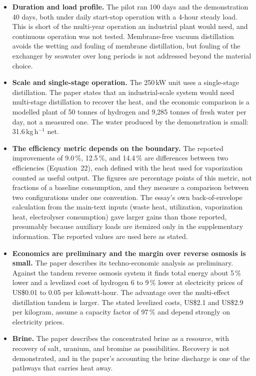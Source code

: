 \documentclass[11pt]{article}
\theoremstyle{definition}
\theoremstyle{remark}
\begin{document}
\begin{itemize}[leftmargin=1.6em,itemsep=2pt]
  \item \textbf{Duration and load profile.} The pilot ran 100 days and the demonstration 40 days, both under daily start-stop operation with a 4-hour steady load. This is short of the multi-year operation an industrial plant would need, and continuous operation was not tested. Membrane-free vacuum distillation avoids the wetting and fouling of membrane distillation, but fouling of the exchanger by seawater over long periods is not addressed beyond the material choice.
  \item \textbf{Scale and single-stage operation.} The 250\,kW unit uses a single-stage distillation. The paper states that an industrial-scale system would need multi-stage distillation to recover the heat, and the economic comparison is a modelled plant of 50 tonnes of hydrogen and 9,285 tonnes of fresh water per day, not a measured one. The water produced by the demonstration is small: 31.6\,kg\,h$^{-1}$ net.
  \item \textbf{The efficiency metric depends on the boundary.} The reported improvements of 9.0\,\%, 12.5\,\%, and 14.4\,\% are differences between two efficiencies (Equation~22), each defined with the heat used for vaporization counted as useful output. The figures are percentage points of this metric, not fractions of a baseline consumption, and they measure a comparison between two configurations under one convention. The essay's own back-of-envelope calculation from the main-text inputs (waste heat, utilization, vaporization heat, electrolyser consumption) gave larger gains than those reported, presumably because auxiliary loads are itemized only in the supplementary information. The reported values are used here as stated.
  \item \textbf{Economics are preliminary and the margin over reverse osmosis is small.} The paper describes its techno-economic analysis as preliminary. Against the tandem reverse osmosis system it finds total energy about 5\,\% lower and a levelized cost of hydrogen 6 to 9\,\% lower at electricity prices of US\$0.01 to 0.05 per kilowatt-hour. The advantage over the multi-effect distillation tandem is larger. The stated levelized costs, US\$2.1 and US\$2.9 per kilogram, assume a capacity factor of 97\,\% and depend strongly on electricity prices.
  \item \textbf{Brine.} The paper describes the concentrated brine as a resource, with recovery of salt, uranium, and bromine as possibilities. Recovery is not demonstrated, and in the paper's accounting the brine discharge is one of the pathways that carries heat away.

\end{itemize}
\end{document}
